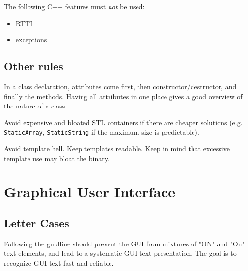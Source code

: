 \documentclass[a4paper,12pt]{refrep}
\begin{document}
The following C++ features must \emph{not} be used:

\begin{itemize}
\item RTTI
\item exceptions
\end{itemize}

\subsection{Other rules}

In a class declaration, attributes come first, then
constructor/destructor, and finally the methods.  Having all
attributes in one place gives a good overview of the nature of a
class.

Avoid expensive and bloated STL containers if there are cheaper
solutions (e.g. \texttt{StaticArray}, \texttt{StaticString} if the
maximum size is predictable).

Avoid template hell.  Keep templates readable.  Keep in mind that
excessive template use may bloat the binary.

\section{Graphical User Interface}
\subsection{Letter Cases}

Following the guidline should prevent the GUI from mixtures of "ON" and 
"On" text elements, and lead to a systematic GUI text presentation. 
The goal is to recognize GUI text fast and reliable.
\end{document}
